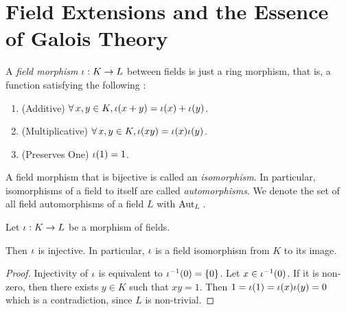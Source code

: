 \documentclass[main.tex]{subfiles}
\begin{document}
\section{Field Extensions and the Essence of Galois Theory}

\begin{dfn} 

  A \emph{field morphism} $\iota : K \to L$ between fields is
  just a ring morphism, that is, a function satisfying the following : 
  \begin{enumerate}
    \item (Additive)
    $\forall\, x, y \in K, \iota(x + y) = \iota(x) + \iota(y)$. 
    \item (Multiplicative) 
    $\forall\, x, y \in K, \iota(x y) = \iota(x) \iota(y)$. 
    \item (Preserves One) $\iota(1) = 1$.  
  \end{enumerate} 
  A field morphism that is bijective is called an \emph{isomorphism}. 
  In particular, 
  isomorphisms of a field to itself are called \emph{automorphisms}. 
  We denote the set of all field automorphisms of a field $L$ 
  with $\mathrm{Aut}_{L}\,$. 
\end{dfn}

\begin{thm}
  
  Let $\iota : K \to L$ be a morphism of fields. 

  Then $\iota$ is injective. 
  In particular, $\iota$ is a field isomorphism from $K$ to its image. 
\end{thm}
\begin{proof}
  Injectivity of $\iota$ is equivalent to $\iota^{-1}(0) = \{0\}$. 
  Let $x \in \iota^{-1}(0)$.
  If it is non-zero, then there exists $y \in K$ such that $x y = 1$. 
  Then $1 = \iota(1) = \iota(x) \iota(y) = 0$
  which is a contradiction, since $L$ is non-trivial. 
\end{proof}
\end{document}
